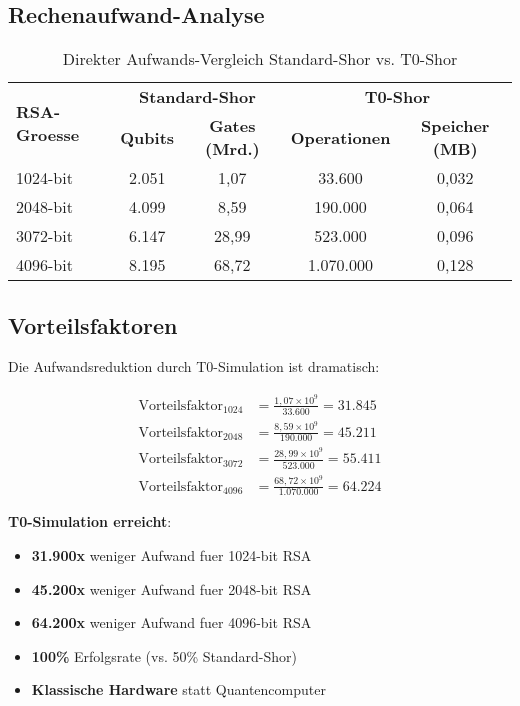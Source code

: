 \documentclass[12pt,a4paper]{article}
\begin{document}
	\subsection{Rechenaufwand-Analyse}
	
	\begin{table}[htbp]
		\centering
		\begin{tabular}{lcccc}
			\toprule
			\multirow{2}{*}{\textbf{RSA-Groesse}} & \multicolumn{2}{c}{\textbf{Standard-Shor}} & \multicolumn{2}{c}{\textbf{T0-Shor}} \\
			\cmidrule(lr){2-3} \cmidrule(lr){4-5}
			& \textbf{Qubits} & \textbf{Gates (Mrd.)} & \textbf{Operationen} & \textbf{Speicher (MB)} \\
			\midrule
			\rowcolor{red!20} 1024-bit & 2.051 & 1,07 & 33.600 & 0,032 \\
			\rowcolor{orange!20} 2048-bit & 4.099 & 8,59 & 190.000 & 0,064 \\
			\rowcolor{yellow!20} 3072-bit & 6.147 & 28,99 & 523.000 & 0,096 \\
			\rowcolor{green!20} 4096-bit & 8.195 & 68,72 & 1.070.000 & 0,128 \\
			\bottomrule
		\end{tabular}
		\caption{Direkter Aufwands-Vergleich Standard-Shor vs. T0-Shor}
		\label{tab:effort_comparison}
	\end{table}
	
	\subsection{Vorteilsfaktoren}
	
	Die Aufwandsreduktion durch T0-Simulation ist dramatisch:
	
	\begin{align}
		\text{Vorteilsfaktor}_{1024} &= \frac{1,07 \times 10^9}{33.600} = 31.845 \\
		\text{Vorteilsfaktor}_{2048} &= \frac{8,59 \times 10^9}{190.000} = 45.211 \\
		\text{Vorteilsfaktor}_{3072} &= \frac{28,99 \times 10^9}{523.000} = 55.411 \\
		\text{Vorteilsfaktor}_{4096} &= \frac{68,72 \times 10^9}{1.070.000} = 64.224
	\end{align}
	
	\begin{tcolorbox}[colback=green!5!white,colframe=green!75!black,title=Revolutionaere Effizienzsteigerung]
		\textbf{T0-Simulation erreicht}:
		\begin{itemize}
			\item \textbf{31.900x} weniger Aufwand fuer 1024-bit RSA
			\item \textbf{45.200x} weniger Aufwand fuer 2048-bit RSA
			\item \textbf{64.200x} weniger Aufwand fuer 4096-bit RSA
			\item \textbf{100\%} Erfolgsrate (vs. 50\% Standard-Shor)
			\item \textbf{Klassische Hardware} statt Quantencomputer
		\end{itemize}
	\end{tcolorbox}
	
\end{document}
